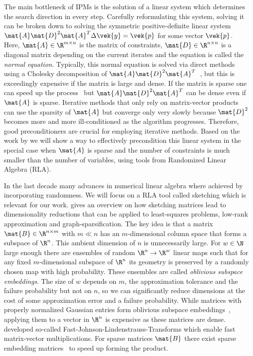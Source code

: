 The main bottleneck of IPMs is the solution of a linear system which determines the search direction in every step.
Carefully reformulating this system, solving it can be broken down to solving the symmetric positive-definite linear system \(\mat{A} \mat{D}^2 \mat{A}^T \Delta \vek{y} = \vek{p}\) for some vector \(\vek{p}\).
Here, \(\mat{A} \in \R^{m \times n}\) is the matrix of constraints, \(\mat{D} \in \R^{n \times n}\) is a diagonal matrix depending on the current iterates and the equation is called the \emph{normal equation}.
Typically, this normal equation is solved via direct methods using a Cholesky decomposition of \(\mat{A} \mat{D}^2 \mat{A}^T\)~\cite[p. 17]{Wright-PrimalDualInteriorPointMethods}, but this is exceedingly expensive if the matrix is large and dense.
If the matrix is sparse one can speed up the process~\cite{NgPeyton-SparseCholesky} but \(\mat{A} \mat{D}^2 \mat{A}^T\) can be dense even if \(\mat{A}\) is sparse.
Iterative methods that only rely on matrix-vector products can use the sparsity of \(\mat{A}\) but converge only very slowly because \(\mat{D}^2\) becomes more and more ill-conditioned as the algorithm progresses.
Therefore, good preconditioners are crucial for employing iterative methods.
Based on the work by \textcite{Avron-FasterRandomizedInfeasibleIPMs} we will show a way to effectively precondition this linear system in the special case when \(\mat{A}\) is sparse and the number of constraints is much smaller than the number of variables, using tools from Randomized Linear Algebra (RLA).

In the last decade many advances in numerical linear algebra where achieved by incorporating randomness.
We will focus on a RLA tool called sketching which is relevant for our work.
\textcite{Woodruff-Sketching} gives an overview on how sketching matrices lead to dimensionality reductions that can be applied to least-squares problems, low-rank approximation and graph-sparsification.
The key idea is that a matrix \(\mat{B} \in \R^{n \times m}\) with \(m \ll n\) has an \(m\)-dimensional column space that forms a subspace of \(\R^n\).
This ambient dimension of \(n\) is unnecessarily large.
For \(w \in \N\) large enough there are ensembles of random \(\R^n \to \R^w\) linear maps such that for any fixed \(m\)-dimensional subspace of \(\R^n\) its geometry is preserved by a randomly chosen map with high probability.
These ensembles are called \emph{oblivious subspace embeddings}.
The size of \(w\) depends on \(m\), the approximation tolerance and the failure probability but not on \(n\), so we can significantly reduce dimensions at the cost of some approximation error and a failure probability.
While matrices with properly normalized Gaussian entries form oblivious subspace embeddings~\cite[Theorem 6]{Woodruff-Sketching}, applying them to a vector in \(\R^n\) is expensive as these matrices are dense.
\textcite{AilonChazelle-FastJohnsonLindenstraussTransform} developed so-called Fast-Johnson-Lindenstrauss-Transforms which enable fast matrix-vector multiplications. For sparse matrices \(\mat{B}\) there exist sparse embedding matrices~\cite{Achlioptas-SparseSketching,Cohen-NearlyTightObliviousSubspaceEmbeddings} to speed up forming the product.

